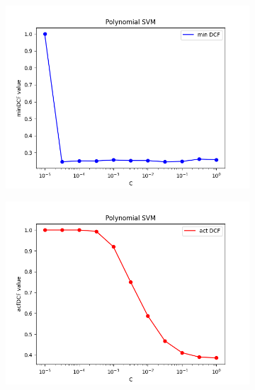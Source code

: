 \begin{figure}[h!]
    \centering
    \begin{subfigure}[b]{0.30\linewidth}
        \includegraphics[width=\linewidth]{Lab/09. Lab 09/Images/04. Poly - minDCF}
        \label{fig:PolyminDCF}
    \end{subfigure}
    \begin{subfigure}[b]{0.30\linewidth}
        \includegraphics[width=\linewidth]{Lab/09. Lab 09/Images/05. Poly - actDCF}
        \label{fig:PolyactDCF}
    \end{subfigure}
    \begin{subfigure}[b]{0.30\linewidth}

\end{subfigure}
\end{figure}
